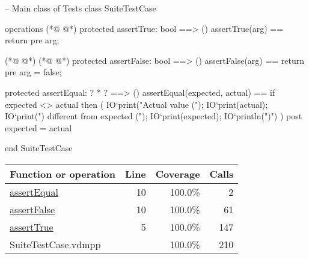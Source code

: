 \begin{vdmpp}[breaklines=true]
-- Main class of Tests
class SuiteTestCase

operations
(*@
\label{assertTrue:5}
@*)
  protected assertTrue: bool ==> ()
  assertTrue(arg) ==
    return
  pre arg;
  
(*@
\label{assertEqual:10}
@*)
(*@
\label{assertFalse:10}
@*)
  protected assertFalse: bool ==> ()
  assertFalse(arg) ==
    return
  pre arg = false;
 
  protected assertEqual: ? * ? ==> ()
  assertEqual(expected, actual) ==
    if expected <> actual then (
      IO`print("Actual value (");
      IO`print(actual);
      IO`print(") different from expected (");
      IO`print(expected);
      IO`println(")\n")
    )
  post expected = actual

end SuiteTestCase
\end{vdmpp}
\bigskip
\begin{longtable}{|l|r|r|r|}
\hline
Function or operation & Line & Coverage & Calls \\
\hline
\hline
\hyperref[assertEqual:10]{assertEqual} & 10&100.0\% & 2 \\
\hline
\hyperref[assertFalse:10]{assertFalse} & 10&100.0\% & 61 \\
\hline
\hyperref[assertTrue:5]{assertTrue} & 5&100.0\% & 147 \\
\hline
\hline
SuiteTestCase.vdmpp & & 100.0\% & 210 \\
\hline
\end{longtable}

